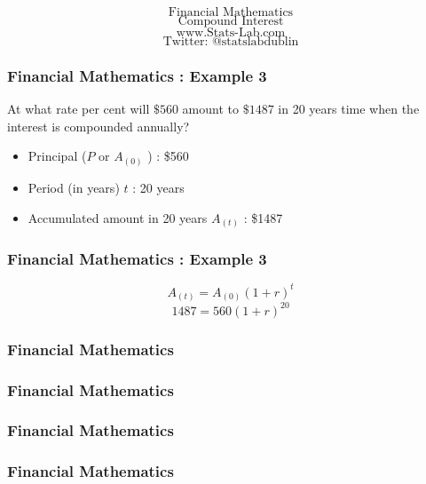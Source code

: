 \documentclass{beamer}
\begin{document}
\begin{frame}

{
\Huge
\[\mbox{Financial Mathematics}\]
\huge
\[\mbox{Compound Interest}\]
}
{
\Large
\[\mbox{www.Stats-Lab.com}\]
\[\mbox{Twitter: @statslabdublin}\]
}
\end{frame}
\begin{frame}
\frametitle{Financial Mathematics : Example 3}
{\Large
At what rate per cent will $\$560$ amount to $\$1487$ in 20 years time when the interest is compounded annually?


\begin{itemize}
\item Principal ($P$ or $A_{(0)}$ )  : \$560
\item Period (in years) $t$ : 20 years
\item Accumulated amount in 20 years $A_{(t)}$ : \$1487
\end{itemize}
}

\end{frame}
\begin{frame}
\frametitle{Financial Mathematics : Example 3}
\vspace{-2cm}

{
\LARGE
\vspace{-2.3cm}
\[ A_{(t)} = A_{(0)} ( 1 + r )^{t}\]
\[ 1487 = 560 ( 1 + r )^{20}\]
 }


\end{frame}
\begin{frame}
\frametitle{Financial Mathematics}

\end{frame}
\begin{frame}
\frametitle{Financial Mathematics}

\end{frame}
\begin{frame}
\frametitle{Financial Mathematics}

\end{frame}
\begin{frame}
\frametitle{Financial Mathematics}

\end{frame}
\end{document}
